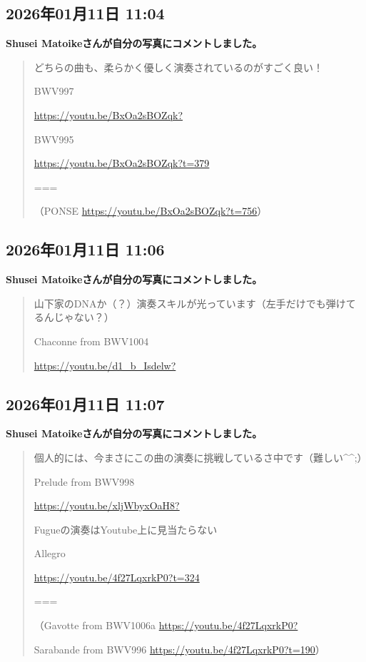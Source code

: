 \subsection*{2026年01月11日 11:04}

\textbf{Shusei Matoikeさんが自分の写真にコメントしました。}

\begin{quote}
どちらの曲も、柔らかく優しく演奏されているのがすごく良い！

BWV997

\url{https://youtu.be/BxOa2sBOZqk?}

BWV995

\url{https://youtu.be/BxOa2sBOZqk?t=379}

===

（PONSE \url{https://youtu.be/BxOa2sBOZqk?t=756}）
\end{quote}

\subsection*{2026年01月11日 11:06}

\textbf{Shusei Matoikeさんが自分の写真にコメントしました。}

\begin{quote}
山下家のDNAか（？）演奏スキルが光っています（左手だけでも弾けてるんじゃない？）

Chaconne from BWV1004

\url{https://youtu.be/d1_b_Isdelw?}
\end{quote}

\subsection*{2026年01月11日 11:07}

\textbf{Shusei Matoikeさんが自分の写真にコメントしました。}

\begin{quote}
個人的には、今まさにこの曲の演奏に挑戦しているさ中です（難しい\textasciicircum{}\textasciicircum{};）

Prelude from BWV998

\url{https://youtu.be/xljWbyxOaH8?}

Fugueの演奏はYoutube上に見当たらない

Allegro

\url{https://youtu.be/4f27LqxrkP0?t=324}

===

（Gavotte from BWV1006a \url{https://youtu.be/4f27LqxrkP0?}

Sarabande from BWV996 \url{https://youtu.be/4f27LqxrkP0?t=190}）
\end{quote}

